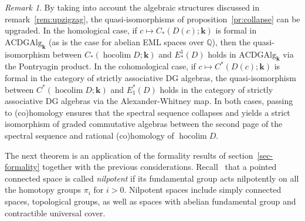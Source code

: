 \documentclass{amsart}
\theoremstyle{definition}
\theoremstyle{remark}
\newtheorem{remark}[formula]{Remark}
\newcommand{\Q}{\mathbb Q}
\DeclareMathOperator{\hoc}{hocolim}
\def\k{\mathbf{k}}
\begin{document}
\begin{remark}
	By taking into account the algebraic structures discussed in remark~\ref{rem:upzigzag}, the quasi-isomorphisms of proposition~\ref{pr:collapse} can be upgraded. In the homological case, if $c\mapsto C_{*}(D(c);\k)$ is formal in $\mathrm{ACDGAlg}_{\k}$ (as is the case for abelian EML spaces over $\Q$), then the quasi-isomorphism between $C_{*}(\hoc D;\k)$ and $E_*^1(D)$ holds in $\mathrm{ACDGAlg}_{\k}$ via the Pontryagin product.
	In the cohomological case, if $c\mapsto C^{*}(D(c);\k)$ is formal in the category of strictly associative DG algebras, the quasi-isomorphism between $C^{*}(\hoc D;\k)$ and $E^{*}_1(D)$ holds in the category of strictly associative DG algebras via the Alexander-Whitney map.
	In both cases, passing to (co)homology ensures that the spectral sequence collapses and yields a strict isomorphism of graded commutative algebras between the second page of the spectral sequence and rational (co)homology of $\hoc D$.
\end{remark}

The next theorem is an application of the formality results of section~\ref{sec-formality} together with the previous considerations. Recall~\cite[II~4.3]{bo-ka-72} that a pointed connected space is called \emph{nilpotent} if its fundamental group acts nilpotently on all the homotopy groups $\pi_i$ for $i>0$. Nilpotent spaces include simply connected spaces, topological groups, as well as spaces with abelian fundamental group and contractible universal cover.
\end{document}
